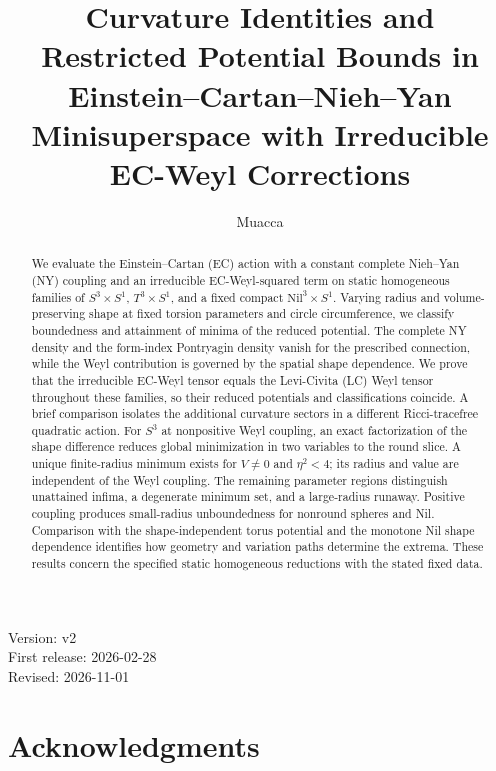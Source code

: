 \documentclass[11pt,a4paper]{article}
\title{Curvature Identities and Restricted Potential Bounds in Einstein--Cartan--Nieh--Yan Minisuperspace with Irreducible EC-Weyl Corrections}
\author{Muacca}
\date{}
\begin{document}
\maketitle
\begin{center}
Version: v2\\
First release: 2026-02-28\\
Revised: 2026-11-01
\end{center}
\begin{abstract}
We evaluate the Einstein--Cartan (EC) action with a constant complete Nieh--Yan (NY)
coupling and an irreducible EC-Weyl-squared term on static homogeneous families of
$S^3\times S^1$, $T^3\times S^1$, and a fixed compact
$\mathrm{Nil}^3\times S^1$. Varying radius and volume-preserving shape at fixed
torsion parameters and circle circumference, we classify boundedness and
attainment of minima of the reduced potential. The complete NY density and
the form-index Pontryagin density vanish for the prescribed connection,
while the Weyl contribution is governed by the spatial shape dependence.
We prove that the irreducible EC-Weyl tensor equals the Levi-Civita (LC) Weyl tensor
throughout these families, so their reduced potentials and classifications
coincide. A brief comparison isolates the additional curvature sectors in
a different Ricci-tracefree quadratic action.
For $S^3$ at nonpositive Weyl coupling, an exact factorization of the shape
difference reduces global minimization in two variables to the round slice.
A unique finite-radius minimum exists for $V\ne0$ and $\eta^2<4$; its radius
and value are independent of the Weyl coupling. The remaining parameter
regions distinguish unattained infima, a degenerate minimum set, and a
large-radius runaway. Positive coupling produces small-radius unboundedness
for nonround spheres and Nil. Comparison with the shape-independent torus
potential and the monotone Nil shape dependence identifies how geometry
and variation paths determine the extrema. These results concern the
specified static homogeneous reductions with the stated fixed data.
\end{abstract}
{\small
{}
\setcounter{tocdepth}{1}
\makeatletter
\renewcommand*\l@section{\@dottedtocline{1}{0em}{2em}}
\makeatother
\tableofcontents
}
\newpage










\section*{Acknowledgments}
\end{document}
